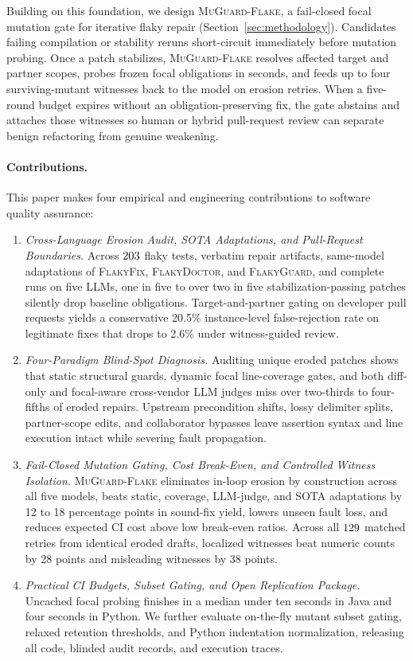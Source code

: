 Building on this foundation, we design \textsc{MuGuard-Flake}, a fail-closed focal mutation gate for iterative flaky repair (Section~\ref{sec:methodology}). Candidates failing compilation or stability reruns short-circuit immediately before mutation probing. Once a patch stabilizes, \textsc{MuGuard-Flake} resolves affected target and partner scopes, probes frozen focal obligations in seconds, and feeds up to four surviving-mutant witnesses back to the model on erosion retries. When a five-round budget expires without an obligation-preserving fix, the gate abstains and attaches those witnesses so human or hybrid pull-request review can separate benign refactoring from genuine weakening.

\paragraph{Contributions.}
This paper makes four empirical and engineering contributions to software quality assurance:
\begin{enumerate}
    \item \emph{Cross-Language Erosion Audit, SOTA Adaptations, and Pull-Request Boundaries.} Across $203$ flaky tests, verbatim repair artifacts, same-model adaptations of \textsc{FlakyFix}, \textsc{FlakyDoctor}, and \textsc{FlakyGuard}, and complete runs on five LLMs, one in five to over two in five stabilization-passing patches silently drop baseline obligations. Target-and-partner gating on developer pull requests yields a conservative 20.5\% instance-level false-rejection rate on legitimate fixes that drops to 2.6\% under witness-guided review.
    \item \emph{Four-Paradigm Blind-Spot Diagnosis.} Auditing \TaxUniquePatches{} unique eroded patches shows that static structural guards, dynamic focal line-coverage gates, and both diff-only and focal-aware cross-vendor LLM judges miss over two-thirds to four-fifths of eroded repairs. Upstream precondition shifts, lossy delimiter splits, partner-scope edits, and collaborator bypasses leave assertion syntax and line execution intact while severing fault propagation.
    \item \emph{Fail-Closed Mutation Gating, Cost Break-Even, and Controlled Witness Isolation.} \textsc{MuGuard-Flake} eliminates in-loop erosion by construction across all five models, beats static, coverage, LLM-judge, and SOTA adaptations by 12 to 18 percentage points in sound-fix yield, lowers unseen fault loss, and reduces expected CI cost above low break-even ratios. Across all $129$ matched retries from identical eroded drafts, localized witnesses beat numeric counts by 28 points and misleading witnesses by 38 points.
    \item \emph{Practical CI Budgets, Subset Gating, and Open Replication Package.} Uncached focal probing finishes in a median under ten seconds in Java and four seconds in Python. We further evaluate on-the-fly mutant subset gating, relaxed retention thresholds, and Python indentation normalization, releasing all code, blinded audit records, and execution traces.
\end{enumerate}

